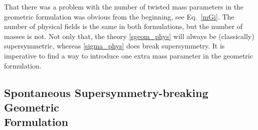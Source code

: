 \documentclass[12pt]{article}
\begin{document}
	That there was a problem with the number of twisted mass parameters in the geometric formulation 
	was obvious from the beginning, see Eq.~\eqref{mGi}.
	The number of physical fields is the same in both formulations, but the number of masses is not.
	Not only that, the theory \eqref{sgeom_phys} will always be (classically) supersymmetric, whereas
	\eqref{sigma_phys} does break supersymmetry.
	It is imperative to find a way to introduce one extra mass parameter in the geometric formulation.


\subsection{Spontaneous Supersymmetry-breaking Geometric \\
Formulation}
\label{sbreaking}
\end{document}
